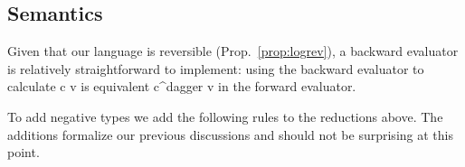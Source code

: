 \documentclass[preprint]{sigplanconf}
\begin{document}
\subsection{Semantics}


Given that our language is reversible (Prop.~\ref{prop:logrev}), a backward
evaluator is relatively straightforward to implement: using the backward
evaluator to calculate {{c v}} is equivalent {{c^{dagger} v}} in the forward
evaluator.


To add negative types we add the following rules to the
  reductions above. The additions formalize our previous discussions
  and should not be surprising at this point.
\end{document}
